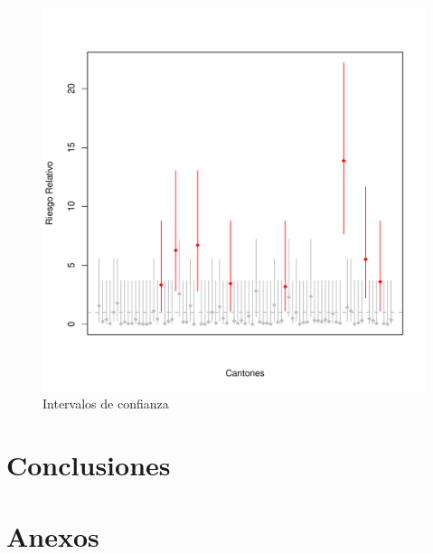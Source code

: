 \documentclass[12pt,a4paper]{article}
\begin{document}
\begin{figure}[hbtp]
\centering
\includegraphics[scale=0.75]{F6.pdf}
\caption{Intervalos de confianza}
\end{figure}


\section{Conclusiones}

\section{Anexos}
\end{document}
